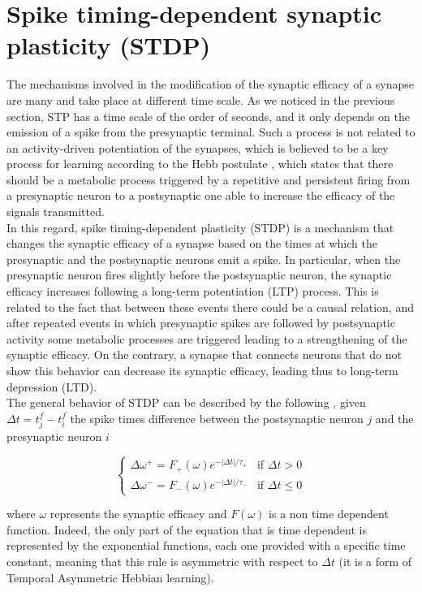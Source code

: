 \documentclass[a4paper, 12pt, twoside, openright]{book}
\begin{document}
\section{Spike timing-dependent synaptic plasticity (STDP)}
The mechanisms involved in the modification of the synaptic efficacy of a synapse are many and take place at different time scale. As we noticed in the previous section, STP has a time scale of the order of seconds, and it only depends on the emission of a spike from the presynaptic terminal. Such a process is not related to an activity-driven potentiation of the synapses, which is believed to be a key process for learning according to the Hebb postulate \cite{hebb-organization-of-behavior-1949}, which states that there should be a metabolic process triggered by a repetitive and persistent firing from a presynaptic neuron to a postsynaptic one able to increase the efficacy of the signals transmitted.\\
In this regard, spike timing-dependent plasticity (STDP) is a mechanism that changes the synaptic efficacy of a synapse based on the times at which the presynaptic and the postsynaptic neurons emit a spike. In particular, when the presynaptic neuron fires slightly before the postsynaptic neuron, the synaptic efficacy increases following a long-term potentiation (LTP) process. This is related to the fact that between these events there could be a causal relation, and after repeated events in which presynaptic spikes are followed by postsynaptic activity some metabolic processes are triggered leading to a strengthening of the synaptic efficacy. On the contrary, a synapse that connects neurons that do not show this behavior can decrease its synaptic efficacy, leading thus to long-term depression (LTD).\\
The general behavior of STDP can be described by the following \cite{Morrison2008, Sjostrom2010}, given $\Delta t=t_j^f-t_i^f$ the spike times difference between the postsynaptic neuron $j$ and the presynaptic neuron $i$

\begin{equation}
\begin{cases}
\Delta \omega^+=F_+(\omega) e^{-|\Delta t|/\tau_+} & \text{if $\Delta t>0$}\\
\Delta \omega^-=F_-(\omega) e^{-|\Delta t|/\tau_-} & \text{if $\Delta t \leq 0$}
\end{cases}
\label{eq:stdp_simple}
\end{equation}

where $\omega$ represents the synaptic efficacy and $F(\omega)$ is a non time dependent function. Indeed, the only part of the equation that is time dependent is represented by the exponential functions, each one provided with a specific time constant, meaning that this rule is asymmetric with respect to $\Delta t$ (it is a form of Temporal Asymmetric Hebbian learning).
\end{document}
